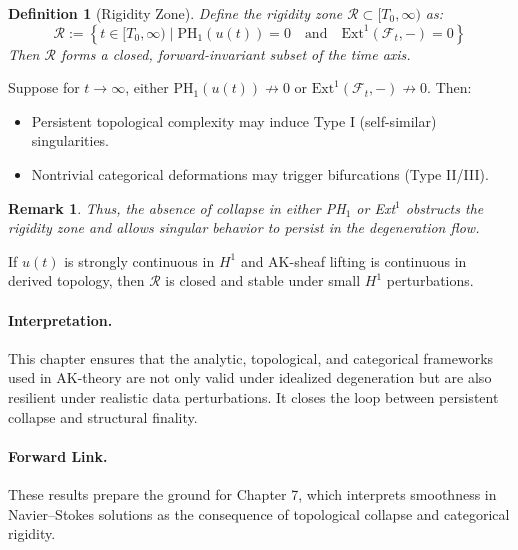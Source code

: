 \documentclass[11pt]{article}
\newtheorem{definition}[theorem]{Definition}
\newtheorem{remark}[theorem]{Remark}
\begin{document}
\begin{definition}[Rigidity Zone]
Define the rigidity zone $\mathcal{R} \subset [T_0, \infty)$ as:
\[
\mathcal{R} := \left\{ t \in [T_0, \infty) \mid \mathrm{PH}_1(u(t)) = 0 \quad \text{and} \quad \mathrm{Ext}^1(\mathcal{F}_t, -) = 0 \right\}
\]
Then $\mathcal{R}$ forms a closed, forward-invariant subset of the time axis.
\end{definition}

\begin{proposition}
Suppose for $t \to \infty$, either $\mathrm{PH}_1(u(t)) \not\to 0$ or $\mathrm{Ext}^1(\mathcal{F}_t, -) \not\to 0$. Then:

\begin{itemize}
    \item Persistent topological complexity may induce Type I (self-similar) singularities.
    \item Nontrivial categorical deformations may trigger bifurcations (Type II/III).
\end{itemize}
\end{proposition}

\begin{remark}
Thus, the absence of collapse in either PH$_1$ or Ext$^1$ obstructs the rigidity zone and allows singular behavior to persist in the degeneration flow.
\end{remark}

\begin{lemma}
If $u(t)$ is strongly continuous in $H^1$ and AK-sheaf lifting is continuous in derived topology, then $\mathcal{R}$ is closed and stable under small $H^1$ perturbations.
\end{lemma}

\paragraph{Interpretation.} 
This chapter ensures that the analytic, topological, and categorical frameworks used in AK-theory are not only valid under idealized degeneration but are also resilient under realistic data perturbations. It closes the loop between persistent collapse and structural finality.

\paragraph{Forward Link.}
These results prepare the ground for Chapter 7, which interprets smoothness in Navier–Stokes solutions as the consequence of topological collapse and categorical rigidity.
\end{document}
